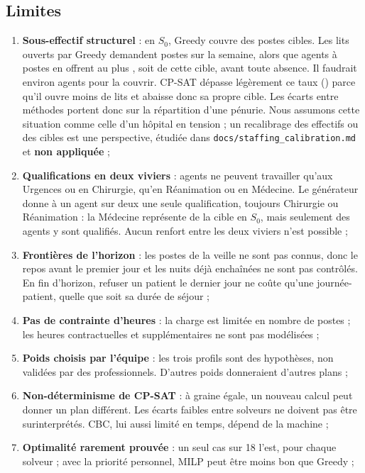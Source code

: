 \subsection{Limites}
\label{sec:limites}
\begin{enumerate}
    \item \textbf{Sous-effectif structurel} : en $S_0$, Greedy couvre \CouvSzGreedy{} des postes cibles. Les lits ouverts par Greedy demandent \CibleSz{} postes sur la semaine, alors que \NbAgents{} agents à \PostesMax{} postes en offrent au plus \CapacitePostes{}, soit \PlafondSz{} de cette cible, avant toute absence. Il faudrait environ \AgentsCent{} agents pour la couvrir. CP-SAT dépasse légèrement ce taux (\CouvSzCp{}) parce qu'il ouvre moins de lits et abaisse donc sa propre cible. Les écarts entre méthodes portent donc sur la répartition d'une pénurie. Nous assumons cette situation comme celle d'un hôpital en tension ; un recalibrage des effectifs ou des cibles est une perspective, étudiée dans \texttt{docs/staffing\_calibration.md} et \textbf{non appliquée} ;
    \item \textbf{Qualifications en deux viviers} : \VivierA{} agents ne peuvent travailler qu'aux Urgences ou en Chirurgie, \VivierB{} qu'en Réanimation ou en Médecine. Le générateur donne à un agent sur deux une seule qualification, toujours Chirurgie ou Réanimation : la Médecine représente \PartCibleMed{} de la cible en $S_0$, mais \QualifMed{} seulement des agents y sont qualifiés. Aucun renfort entre les deux viviers n'est possible ;
    \item \textbf{Frontières de l'horizon} : les postes de la veille ne sont pas connus, donc le repos avant le premier jour et les nuits déjà enchaînées ne sont pas contrôlés. En fin d'horizon, refuser un patient le dernier jour ne coûte qu'une journée-patient, quelle que soit sa durée de séjour ;
    \item \textbf{Pas de contrainte d'heures} : la charge est limitée en nombre de postes ; les heures contractuelles et supplémentaires ne sont pas modélisées ;
    \item \textbf{Poids choisis par l'équipe} : les trois profils sont des hypothèses, non validées par des professionnels. D'autres poids donneraient d'autres plans ;
    \item \textbf{Non-déterminisme de CP-SAT} : à graine égale, un nouveau calcul peut donner un plan différent. Les écarts faibles entre solveurs ne doivent pas être surinterprétés. CBC, lui aussi limité en temps, dépend de la machine ;
    \item \textbf{Optimalité rarement prouvée} : un seul cas sur 18 l'est, pour chaque solveur ; avec la priorité personnel, MILP peut être moins bon que Greedy ;

\end{enumerate}
